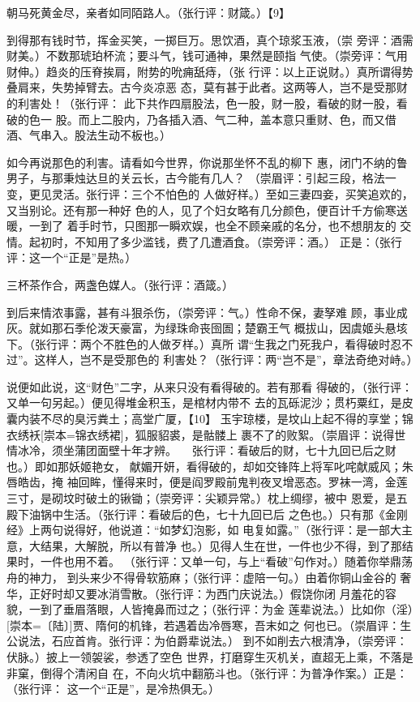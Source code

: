 \documentclass[UTF8,scheme=chinese,11pt,linespread=1.4]{ctexbook}
\makeatletter
\newcommand{\banben}[2][]{#2}
\newenvironment{diben}[1]
  {\list{}{\listparindent 2em
    \itemindent\listparindent
    \rightmargin 0em  %
    \leftmargin 0em  %
    \parsep \z@ \@plus\p@}%
   \item\relax}
  {\endlist}
\makeatother
\begin{document}
\begin{diben}
一朝马死黄金尽，亲者如同陌路人。（张行评：财箴。）【9】

\noindent 到得那有钱时节，挥金买笑，一掷巨万。思饮酒，真个琼浆玉液，（崇
旁评：酒需财美。）不数那琥珀杯流；要斗气，钱可通神，果然是颐指
气使。（崇旁评：气用财伸。）趋炎的压脊挨肩，附势的吮痈舐痔，（张
行评：以上正说财。）真所谓得势叠肩来，失势掉臂去。古今炎凉恶
态，莫有甚于此者。这两等人，岂不是受那财的利害处！（张行评：
此下共作四扇股法，色一股，财一股，看破的财一股，看破的色一
股。而上二股内，乃各插入酒、气二种，盖本意只重财、色，而又借
酒、气串入。股法生动不板也。）

如今再说那色的利害。请看如今世界，你说那坐怀不乱的柳下
惠，闭门不纳的鲁男子，与那秉烛达旦的关云长，古今能有几人？
（崇眉评：引起三段，格法一变，更见灵活。张行评：三个不怕色的
人做好样。）至如三妻四妾，买笑追欢的，又当别论。还有那一种好
色的人，见了个妇女略有几分颜色，便百计千方偷寒送暖，一到了
着手时节，只图那一瞬欢娱，也全不顾亲戚的名分，也不想朋友的
交情。起初时，不知用了多少滥钱，费了几遭酒食。（崇旁评：酒。）
正是：（张行评：这一个“正是”是热。）

三杯茶作合，两盏色媒人。（张行评：酒箴。）

到后来情浓事露，甚有斗狠杀伤，（崇旁评：气。）性命不保，妻孥难
顾，事业成灰。就如那石季伦泼天豪富，为绿珠命丧囹圄；楚霸王气
概拔山，因虞姬头悬垓下。（张行评：两个不胜色的人做歹样。）真所
谓“生我之门死我户，看得破时忍不过”。这样人，岂不是受那色的
利害处？（张行评：两“岂不是”，章法奇绝对峙。）

说便如此说，这“财色”二字，从来只没有看得破的。若有那看
得破的，（张行评：又单一句另起。）便见得堆金积玉，是棺材内带不
去的瓦砾泥沙；贯朽粟红，是皮囊内装不尽的臭污粪土；高堂广厦，【10】
玉宇琼楼，是坟山上起不得的享堂；\banben{锦衣绣袄}[崇本={锦衣绣裙}]，狐服貂裘，是骷髅上
裹不了的败絮。（崇眉评：说得世情冰冷，须坐蒲团面壁十年才辨。
　张行评：看破后的财，七十九回已后之财也。）即如那妖姬艳女，
献媚开妍，看得破的，却如交锋阵上将军叱咤献威风；朱唇皓齿，掩
袖回眸，懂得来时，便是阎罗殿前鬼判夜叉增恶态。罗袜一湾，金莲
三寸，是砌坟时破土的锹锄；（崇旁评：尖颖异常。）枕上绸缪，被中
恩爱，是五殿下油锅中生活。（张行评：看破后的色，七十九回已后
之色也。）只有那《金刚经》上两句说得好，他说道：“如梦幻泡影，如
电复如露。”（张行评：是一部大主意，大结果，大解脱，所以有普净
也。）见得人生在世，一件也少不得，到了那结果时，一件也用不着。
（张行评：又单一句，与上“看破”句作对。）随着你举鼎荡舟的神力，
到头来少不得骨软筋麻；（张行评：虚陪一句。）由着你铜山金谷的
奢华，正好时却又要冰消雪散。（张行评：为西门庆说法。）假饶你闭
月羞花的容貌，一到了垂眉落眼，人皆掩鼻而过之；（张行评：为金
莲辈说法。）比如你\banben{（淫）}[崇本={〔陆〕}]贾、隋何的机锋，若遇着齿冷唇寒，吾末如之
何也已。（崇眉评：生公说法，石应首肯。张行评：为伯爵辈说法。）
到不如削去六根清净，（崇旁评：伏脉。）披上一领袈裟，参透了空色
世界，打磨穿生灭机关，直超无上乘，不落是非窠，倒得个清闲自
在，不向火坑中翻筋斗也。（张行评：为普净作案。）正是：（张行评：
这一个“正是”，是冷热俱无。）


\end{diben}
\end{document}
